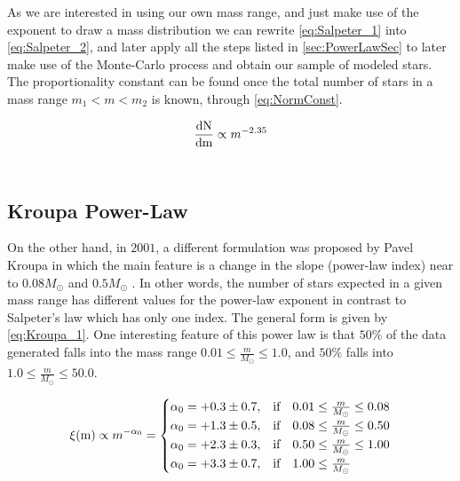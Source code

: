 As we are interested in using our own mass range, and just make use of the exponent to draw a mass distribution we can rewrite \autoref{eq:Salpeter_1} into \autoref{eq:Salpeter_2}, and later apply all the steps listed in \autoref{sec:PowerLawSec} to later make use of the Monte-Carlo process and obtain our sample of modeled stars. The proportionality constant can be found once the total number of stars in a mass range $m_1 < m < m_2$ is known, through \autoref{eq:NormConst}.

\begingroup
\Large
\begin{equation}
  \frac{\textnormal{dN}}{\textnormal{dm}} \propto m^{-2.35}
 \label{eq:Salpeter_2}
\end{equation}
\endgroup\\

\subsection{Kroupa Power-Law}\label{subsec:Kroupa}

On the other hand, in $2001$, a different formulation was proposed by Pavel Kroupa in which the main feature is a change in the slope (power-law index) near to $0.08M_\odot$ and $0.5M_\odot$ \citeyear{2001MNRAS.322..231K}. In other words, the number of stars expected in a given mass range has different values for the power-law exponent in contrast to Salpeter's law which has only one index. The general form is given by \autoref{eq:Kroupa_1}. One interesting feature of this power law is that $50\%$ of the data generated falls into the mass range $0.01 \leq \frac{m}{M_\odot} \leq 1.0$, and $50\%$ falls into $1.0 \leq \frac{m}{M_\odot} \leq 50.0$. 

\begingroup
\Large
\begin{equation}
    \xi(\textnormal{m}) \propto m^{-\alpha_0} = 
    \begin{cases}
     \alpha_0 = +0.3 \pm 0.7,& \text{if } ~~ 0.01 \leq \frac{m}{M_\odot} \leq 0.08\\
     \alpha_0 = +1.3 \pm 0.5,& \text{if } ~~ 0.08 \leq \frac{m}{M_\odot} \leq 0.50\\
     \alpha_0 = +2.3 \pm 0.3,& \text{if } ~~ 0.50 \leq \frac{m}{M_\odot} \leq 1.00\\
     \alpha_0 = +3.3 \pm 0.7,& \text{if } ~~ 1.00 \leq \frac{m}{M_\odot}
    \end{cases}
\label{eq:Kroupa_1}
\end{equation}
\endgroup\\

